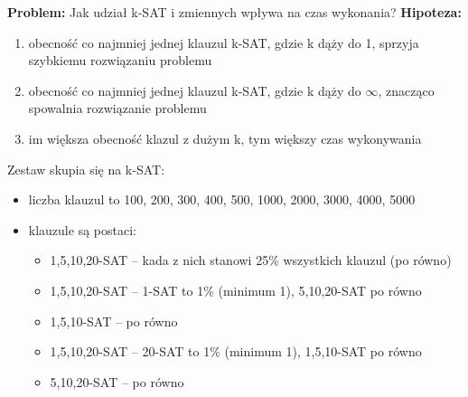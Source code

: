 \documentclass[a4paper,12pt]{article}
\begin{document}
\noindent
\textbf{Problem:} Jak udział k-SAT i zmiennych wpływa na czas wykonania?
\newline
\textbf{Hipoteza:}
\begin{enumerate}
  \item obecność co najmniej jednej klauzul k-SAT, gdzie k dąży do 1, sprzyja szybkiemu rozwiązaniu problemu
  \item obecność co najmniej jednej klauzul k-SAT, gdzie k dąży do $\infty$, znacząco spowalnia rozwiązanie problemu
  \item im większa obecność klazul z dużym k, tym większy czas wykonywania
\end{enumerate}

Zestaw skupia się na k-SAT:
\begin{itemize}
  \item liczba klauzul to 100, 200, 300, 400, 500, 1000, 2000, 3000, 4000, 5000
  \item klauzule są postaci:
    \begin{itemize}
      \item 1,5,10,20-SAT -- kada z nich stanowi 25\% wszystkich klauzul (po równo)
      \item 1,5,10,20-SAT -- 1-SAT to 1\% (minimum 1), 5,10,20-SAT po równo
      \item 1,5,10-SAT -- po równo
      \item 1,5,10,20-SAT -- 20-SAT to 1\% (minimum 1), 1,5,10-SAT po równo
      \item 5,10,20-SAT -- po równo
    \end{itemize}
\end{itemize}


%
\end{document}
